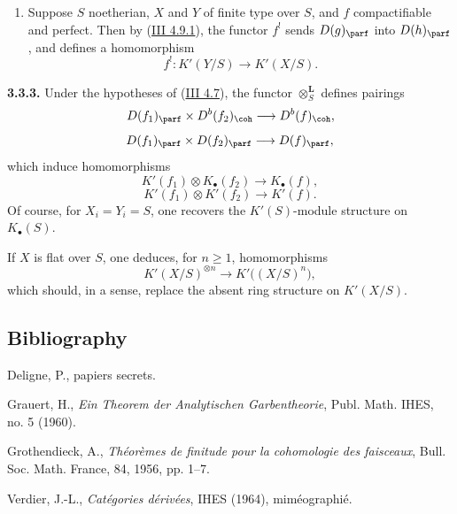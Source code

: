 \begin{enumerate}[label=\textbf{3.3.2.\arabic*.}, leftmargin=4em]
\item Suppose \(S\) noetherian, \(X\) and \(Y\) of finite type over \(S\), and \(f\) compactifiable and perfect. Then by (\hyperlink{sga6.e03.cor.4-9-1}{III 4.9.1}), the functor \(f^!\) sends \(D(g)_{\parf}\) into \(D(h)_{\parf}\), and defines a homomorphism
\[
 f^!:K'(Y/S)\longrightarrow K'(X/S).
\]
\end{enumerate}

\textbf{3.3.3.} Under the hypotheses of (\hyperlink{sga6.e03.prop.4-7}{III 4.7}), the functor \(\otimes_S^{\mathbf L}\) defines pairings
\[
 D(f_1)_{\parf}\times D^b(f_2)_{\coh}\longrightarrow D^b(f)_{\coh},
\]
\[
 D(f_1)_{\parf}\times D(f_2)_{\parf}\longrightarrow D(f)_{\parf},
\]
which induce homomorphisms
\[
 K'(f_1)\otimes K_{\bullet}(f_2)\longrightarrow K_{\bullet}(f),
\]
\[
 K'(f_1)\otimes K'(f_2)\longrightarrow K'(f).
\]
Of course, for \(X_i=Y_i=S\), one recovers the \(K'(S)\)-module structure on \(K_{\bullet}(S)\).

If \(X\) is flat over \(S\), one deduces, for \(n\geq1\), homomorphisms
\[
 K'(X/S)^{\otimes n}\longrightarrow K'\bigl((X/S)^n\bigr),
\]
which should, in a sense, replace the absent ring structure on \(K'(X/S)\).

\subsection*{Bibliography}
\begin{enumerate}[label={[\arabic*]}]
\item Deligne, P., papiers secrets.
\item Grauert, H., \emph{Ein Theorem der Analytischen Garbentheorie}, Publ. Math. IHES, no. 5 (1960).
\item Grothendieck, A., \emph{Théorèmes de finitude pour la cohomologie des faisceaux}, Bull. Soc. Math. France, 84, 1956, pp. 1--7.
\item[{[V]}] Verdier, J.-L., \emph{Catégories dérivées}, IHES (1964), miméographié.
\end{enumerate}



\providecommand{\Chat}{\widehat C}
\providecommand{\Ghat}{\widehat G}
\providecommand{\Gg}{\widehat G_g}
\providecommand{\Ga}{\widehat G_a}
\providecommand{\Grhat}{\widehat{\operatorname{Gr}}}
\providecommand{\Abfil}{\mathrm{Ab\,fil}}
\providecommand{\Kalgfil}{K\text{-}\mathrm{Alg.fil.}}
\providecommand{\Hom}{\operatorname{Hom}}
\providecommand{\Sym}{\mathfrak S}
\providecommand{\id}{\operatorname{Id}}
\providecommand{\Log}{\operatorname{Log}}
\providecommand{\Toddc}{\operatorname{Todd}}
\providecommand{\Ob}{\operatorname{Ob}}
\providecommand{\cG}{\mathcal G}
\providecommand{\cCzero}{\mathcal C_0}
\providecommand{\Fil}{\operatorname{Fil}}


